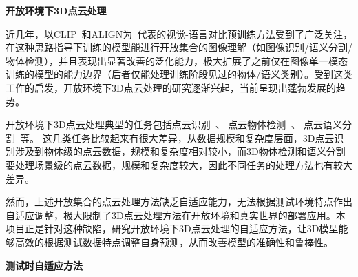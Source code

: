 \documentclass[12pt]{article}
\begin{document}
\textbf{开放环境下3D点云处理}

近几年，以CLIP~\cite{radford21clip}和ALIGN为~\cite{jia21scaling}代表的视觉-语言对比预训练方法受到了广泛关注，在这种思路指导下训练的模型能进行开放集合的图像理解（如图像识别/语义分割/物体检测），并且表现出显著改善的泛化能力，极大扩展了之前仅在图像单一模态训练的模型的能力边界（后者仅能处理训练阶段见过的物体/语义类别）。受到这类工作的启发，开放环境下3D点云处理的研究逐渐兴起，当前呈现出蓬勃发展的趋势。

开放环境下3D点云处理典型的任务包括点云识别~\cite{zhang22pointclip,zhu23pointclip2,sun25pointcache,sun24point-prc,sun24ppt3d,xue23ulip,xue24ulip2,liu23openshape,zhou24uni3d}、
点云物体检测~\cite{zeng23clip2,zhu23pointclip2,lu23ov3det,yang24imov3d,cao23coda,cao25codav2}、
点云语义分割~\cite{jiang24ov3d,kolodiazhnyi2024oneformer3d,zhou2025pointsam,rusnak25haec,boudjoghra2025openyolo3d}等。
这几类任务比较起来有很大差异，从数据规模和复杂度层面，3D点云识别涉及到物体级的点云数据，规模和复杂度相对较小，而3D物体检测和语义分割要处理场景级的点云数据，规模和复杂度较大，因此不同任务的处理方法也有较大差异。

然而，上述开放集合的点云处理方法缺乏自适应能力，无法根据测试环境特点作出自适应调整，极大限制了3D点云处理方法在开放环境和真实世界的部署应用。本项目正是针对这种缺陷，研究开放环境下3D点云处理的自适应方法，让3D模型能够高效的根据测试数据特点调整自身预测，从而改善模型的准确性和鲁棒性。

\textbf{测试时自适应方法}
\end{document}
